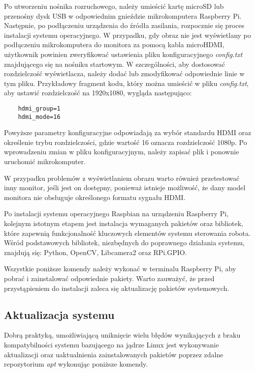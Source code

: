 Po utworzeniu nośnika rozruchowego, należy umieścić kartę microSD lub przenośny dysk USB w odpowiednim gnieździe mikrokomputera Raspberry Pi. Następnie, po podłączeniu urządzenia do źródła zasilania, rozpocznie się proces instalacji systemu operacyjnego. W przypadku, gdy obraz nie jest wyświetlany po podłączeniu mikrokomputera do monitora za pomocą kabla microHDMI, użytkownik powinien zweryfikować ustawienia pliku konfiguracyjnego \textit{config.txt} znajdującego się na nośniku startowym. W szczególności, aby dostosować rozdzielczość wyświetlacza, należy dodać lub zmodyfikować odpowiednie linie w tym pliku. Przykładowy fragment kodu, który można umieścić w pliku \textit{config.txt}, aby ustawić rozdzielczość na 1920x1080, wygląda następująco:

\begin{lstlisting}
    hdmi_group=1
    hdmi_mode=16
\end{lstlisting}

Powyższe parametry konfiguracyjne odpowiadają za wybór standardu HDMI oraz określenie trybu rozdzielczości, gdzie wartość 16 oznacza rozdzielczość 1080p. Po wprowadzeniu zmian w pliku konfiguracyjnym, należy zapisać plik i ponownie uruchomić mikrokomputer.

W przypadku problemów z wyświetlaniem obrazu warto również przetestować inny monitor, jeśli jest on dostępny, ponieważ istnieje możliwość, że dany model monitora nie obsługuje określonego formatu sygnału HDMI.

\vspace*{1cm}

Po instalacji systemu operacyjnego Raspbian na urządzeniu Raspberry Pi, kolejnym istotnym etapem jest instalacja wymaganych pakietów oraz bibliotek, które zapewnią funkcjonalność kluczowych elementów systemu sterowania robota. Wśród podstawowych bibliotek, niezbędnych do poprawnego działania systemu, znajdują się: Python, OpenCV, Libcamera2 oraz RPi.GPIO.

Wszystkie poniższe komendy należy wykonać w terminalu Raspberry Pi, aby pobrać i zainstalować odpowiednie pakiety. Warto zauważyć, że przed przystąpieniem do instalacji zaleca się aktualizację pakietów systemowych.

\subsection{Aktualizacja systemu}
Dobrą praktyką, umożliwiającą uniknięcie wielu błędów wynikających z braku kompatybilności systemu bazującego na jądrze Linux jest wykonywanie aktualizacji oraz uaktualnienia zainstalowanych pakietów poprzez zdalne repozytorium \textit{apt} wykonując poniższe komendy. 

